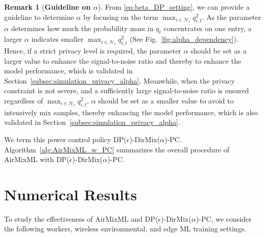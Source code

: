 \documentclass[conference,10pt]{IEEEtran}
\theoremstyle{definition}
\theoremstyle{definition}
\newtheorem{remark}{Remark}
\newcommand{\red}[1]{\textcolor{red}{[#1]}}
\begin{document}
\begin{remark}[\textbf{Guideline on $\alpha$}]
	\label{remark:guideline_to_alpha}
	From \eqref{eq:beta_DP_setting}, we can provide a guideline to determine $\alpha$ by focusing on the term $\max_{i\in\mathcal{N}_t}q^2_{i, t}$.
	As the parameter $\alpha$ determines how much the probability mass in $q_t$ concentrates on one entry, a larger $\alpha$ indicates smaller $\max_{i\in\mathcal{N}_t}q^2_{i, t}$ (See Fig.~\ref{fig:alpha_dependency}).
	Hence, if a strict privacy level is required, the parameter $\alpha$ should be set as a larger value to enhance the signal-to-noise ratio and thereby to enhance the model performance, which is validated in Section~\ref{subsec:simulation_privacy_alpha}.
	Meanwhile, when the privacy constraint is not severe, and a sufficiently large signal-to-noise ratio is ensured regardless of $\max_{i\in\mathcal{N}_t}q^2_{i, t}$, $\alpha$ should be set as a smaller value to avoid to intensively mix samples, thereby enhancing the model performance, which is also validated in Section~\ref{subsec:simulation_privacy_alpha}.
\end{remark}


We term this power control policy \textsf{DP($\epsilon$)-DirMix($\alpha$)-PC}.
Algorithm~\ref{alg:AirMixML_w_PC} summarizes the overall procedure of AirMixML with \textsf{DP($\epsilon$)-DirMix($\alpha$)-PC}.

\vspace{-.5em}
\section{Numerical Results}
To study the effectiveness of AirMixML and \textsf{DP($\epsilon$)-DirMix($\alpha$)-PC}, we consider the following workers, wireless environmental, and edge ML training settings.
\label{sec:simulation}

\end{document}
